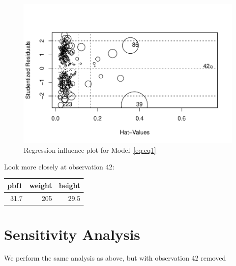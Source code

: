 \documentclass[11pt,letter]{article}\usepackage[]{graphicx}\usepackage[]{color}
\makeatletter
\def\maxwidth{ %
  \ifdim\Gin@nat@width>\linewidth
    \linewidth
  \else
    \Gin@nat@width
  \fi
}
\newenvironment{knitrout}{}{} %
\makeatother
\begin{document}
\begin{knitrout}
\color{fgcolor}\begin{figure}[h]

{\centering \includegraphics[width=\maxwidth]{figure/influence-plot-1} 

}

\caption{Regression influence plot for Model~\eqref{eq:eq1}}\label{fig:influence-plot}
\end{figure}


\end{knitrout}
\FloatBarrier
Look more closely at observation 42:


\begin{tabular}{r|r|r}
\hline
pbf1 & weight & height\\
\hline
31.7 & 205 & 29.5\\
\hline
\end{tabular}



\FloatBarrier
\section{Sensitivity Analysis}

We perform the same analysis as above, but with observation 42 removed
\end{document}
